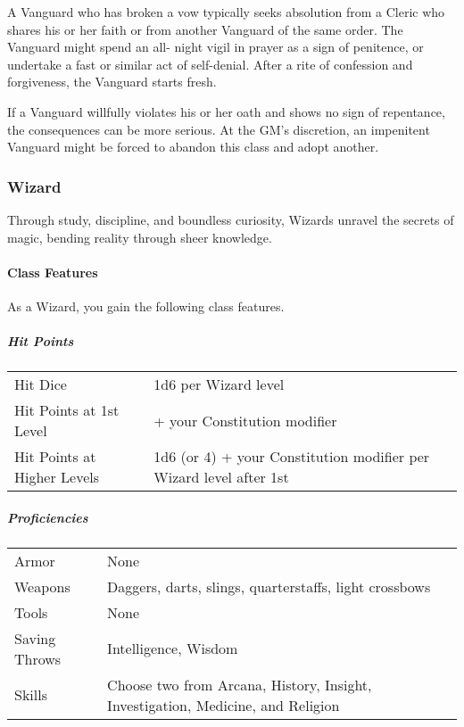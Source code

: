 A Vanguard who has broken a vow typically seeks absolution from a Cleric
who shares his or her faith or from another Vanguard of the same order.
The Vanguard might spend an all- night vigil in prayer as a sign of
penitence, or undertake a fast or similar act of self-denial. After a
rite of confession and forgiveness, the Vanguard starts fresh.

If a Vanguard willfully violates his or her oath and shows no sign of
repentance, the consequences can be more serious. At the GM's
discretion, an impenitent Vanguard might be forced to abandon this class
and adopt another.

\subsubsection{Wizard}\label{wizard-class}

Through study, discipline, and boundless curiosity, Wizards unravel the
secrets of magic, bending reality through sheer knowledge.

\paragraph{Class Features}\label{_class_features_4}

As a Wizard, you gain the following class features.

\subparagraph{Hit Points}\label{_hit_points_4}

\begin{longtable}[]{@{}
  >{\raggedright\arraybackslash}p{}
  >{\raggedright\arraybackslash}p{}@{}}
\toprule\noalign{}
\endhead
\bottomrule\noalign{}
\endlastfoot
Hit Dice & 1d6 per Wizard level \\
Hit Points at 1st Level & 6 + your Constitution modifier \\
Hit Points at Higher Levels & 1d6 (or 4) + your Constitution modifier
per Wizard level after 1st \\
\end{longtable}

\subparagraph{Proficiencies}\label{_proficiencies_4}

\begin{longtable}[]{@{}
  >{\raggedright\arraybackslash}p{}
  >{\raggedright\arraybackslash}p{}@{}}
\toprule\noalign{}
\endhead
\bottomrule\noalign{}
\endlastfoot
Armor & None \\
Weapons & Daggers, darts, slings, quarterstaffs, light crossbows \\
Tools & None \\
Saving Throws & Intelligence, Wisdom \\
Skills & Choose two from Arcana, History, Insight, Investigation,
Medicine, and Religion \\
\end{longtable}

